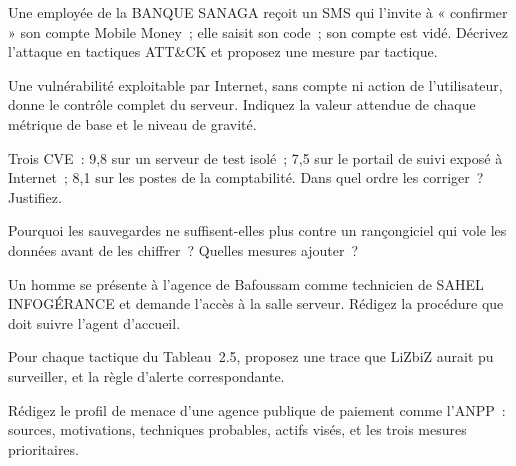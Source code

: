 \begin{boxexo}[title={\ding{45}\quad Exercice~2.4. La chaîne \niveaumoyen}]
Une employée de la BANQUE SANAGA reçoit un SMS qui l'invite à
« confirmer » son compte Mobile Money~; elle saisit son code~; son compte
est vidé. Décrivez l'attaque en tactiques ATT\&CK et proposez une mesure
par tactique.
\end{boxexo}

\begin{boxexo}[title={\ding{45}\quad Exercice~2.5. CVSS \niveaumoyen}]
Une vulnérabilité exploitable par Internet, sans compte ni action de
l'utilisateur, donne le contrôle complet du serveur. Indiquez la valeur
attendue de chaque métrique de base et le niveau de gravité.
\end{boxexo}

\begin{boxexo}[title={\ding{45}\quad Exercice~2.6. Classer les correctifs \niveaumoyen}]
Trois CVE~: 9,8 sur un serveur de test isolé~; 7,5 sur le portail de
suivi exposé à Internet~; 8,1 sur les postes de la comptabilité. Dans
quel ordre les corriger~? Justifiez.
\end{boxexo}

\begin{boxexo}[title={\ding{45}\quad Exercice~2.7. Double extorsion \niveaumoyen}]
Pourquoi les sauvegardes ne suffisent-elles plus contre un rançongiciel
qui vole les données avant de les chiffrer~? Quelles mesures ajouter~?
\end{boxexo}

\begin{boxexo}[title={\ding{45}\quad Exercice~2.8. Le prétexte \niveaumoyen}]
Un homme se présente à l'agence de Bafoussam comme technicien de SAHEL
INFOGÉRANCE et demande l'accès à la salle serveur. Rédigez la procédure
que doit suivre l'agent d'accueil.
\end{boxexo}

\begin{boxexo}[title={\ding{45}\quad Exercice~2.9. Détecter plutôt que bloquer \niveauexpert}]
Pour chaque tactique du Tableau~2.5, proposez une trace que LiZbiZ aurait
pu surveiller, et la règle d'alerte correspondante.
\end{boxexo}

\begin{boxexo}[title={\ding{45}\quad Exercice~2.10. Profil de menace \niveauexpert}]
Rédigez le profil de menace d'une agence publique de paiement comme
l'ANPP~: sources, motivations, techniques probables, actifs visés, et les
trois mesures prioritaires.
\end{boxexo}

